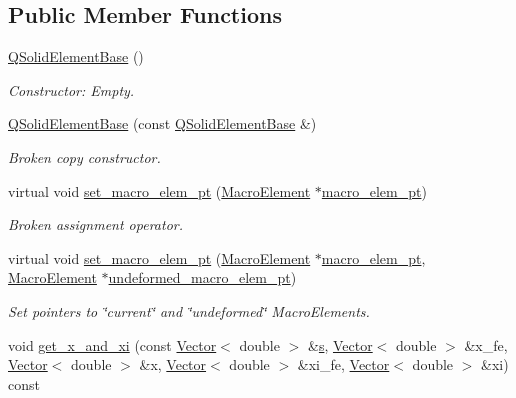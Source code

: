 \subsection*{Public Member Functions}
\begin{DoxyCompactItemize}
\item 
\hyperlink{classoomph_1_1QSolidElementBase_a979a96e9b74885769d875a5a1dd6afb3}{Q\+Solid\+Element\+Base} ()
\begin{DoxyCompactList}\small\item\em Constructor\+: Empty. \end{DoxyCompactList}\item 
\hyperlink{classoomph_1_1QSolidElementBase_a0143287ea9f46d5de01979a2e08a7495}{Q\+Solid\+Element\+Base} (const \hyperlink{classoomph_1_1QSolidElementBase}{Q\+Solid\+Element\+Base} \&)
\begin{DoxyCompactList}\small\item\em Broken copy constructor. \end{DoxyCompactList}\item 
virtual void \hyperlink{classoomph_1_1QSolidElementBase_a0ceca47c039bbb38b0feb3baa330a27f}{set\+\_\+macro\+\_\+elem\+\_\+pt} (\hyperlink{classoomph_1_1MacroElement}{Macro\+Element} $\ast$\hyperlink{classoomph_1_1FiniteElement_aa8bce95f69e3199a508672eea7ecc226}{macro\+\_\+elem\+\_\+pt})
\begin{DoxyCompactList}\small\item\em Broken assignment operator. \end{DoxyCompactList}\item 
virtual void \hyperlink{classoomph_1_1QSolidElementBase_aa7f14a039224fb4c513da587448d2c3b}{set\+\_\+macro\+\_\+elem\+\_\+pt} (\hyperlink{classoomph_1_1MacroElement}{Macro\+Element} $\ast$\hyperlink{classoomph_1_1FiniteElement_aa8bce95f69e3199a508672eea7ecc226}{macro\+\_\+elem\+\_\+pt}, \hyperlink{classoomph_1_1MacroElement}{Macro\+Element} $\ast$\hyperlink{classoomph_1_1SolidFiniteElement_a20517d8d6ba84c8e90d880f38310915f}{undeformed\+\_\+macro\+\_\+elem\+\_\+pt})
\begin{DoxyCompactList}\small\item\em Set pointers to \char`\"{}current\char`\"{} and \char`\"{}undeformed\char`\"{} Macro\+Elements. \end{DoxyCompactList}\item 
void \hyperlink{classoomph_1_1QSolidElementBase_a2afc3bfd3aa6ed253f42d55ac4e20839}{get\+\_\+x\+\_\+and\+\_\+xi} (const \hyperlink{classoomph_1_1Vector}{Vector}$<$ double $>$ \&\hyperlink{cfortran_8h_ab7123126e4885ef647dd9c6e3807a21c}{s}, \hyperlink{classoomph_1_1Vector}{Vector}$<$ double $>$ \&x\+\_\+fe, \hyperlink{classoomph_1_1Vector}{Vector}$<$ double $>$ \&x, \hyperlink{classoomph_1_1Vector}{Vector}$<$ double $>$ \&xi\+\_\+fe, \hyperlink{classoomph_1_1Vector}{Vector}$<$ double $>$ \&xi) const

\end{DoxyCompactItemize}
